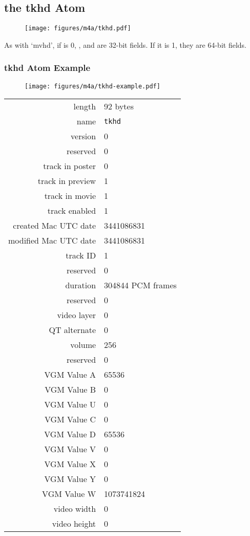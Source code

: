 \subsection{the tkhd Atom}
\label{atom:tkhd}
\begin{figure}[h]
\texttt{[image: figures/m4a/tkhd.pdf]}
\end{figure}
\par
\noindent
As with `mvhd', if  is 0, ,
 and  are 32-bit fields.
If it is 1, they are 64-bit fields.

\clearpage

\subsubsection{tkhd Atom Example}
\begin{figure}[h]
  \texttt{[image: figures/m4a/tkhd-example.pdf]}
\end{figure}
\par
\noindent
\begin{tabular}{rl}
  \textsf{length} & 92 bytes \\
  \textsf{name} & \texttt{tkhd} \\
  \textsf{version} & 0 \\
  \textsf{reserved} & 0 \\
  \textsf{track in poster} & 0 \\
  \textsf{track in preview} & 1 \\
  \textsf{track in movie} & 1 \\
  \textsf{track enabled} & 1 \\
  \textsf{created Mac UTC date} & 3441086831 \\
  \textsf{modified Mac UTC date} & 3441086831 \\
  \textsf{track ID} & 1 \\
  \textsf{reserved} & 0 \\
  \textsf{duration} & 304844 PCM frames \\
  \textsf{reserved} & 0 \\
  \textsf{video layer} & 0 \\
  \textsf{QT alternate} & 0 \\
  \textsf{volume} & 256 \\
  \textsf{reserved} & 0 \\
  \textsf{VGM Value A} & 65536 \\
  \textsf{VGM Value B} & 0 \\
  \textsf{VGM Value U} & 0 \\
  \textsf{VGM Value C} & 0 \\
  \textsf{VGM Value D} & 65536 \\
  \textsf{VGM Value V} & 0 \\
  \textsf{VGM Value X} & 0 \\
  \textsf{VGM Value Y} & 0 \\
  \textsf{VGM Value W} & 1073741824 \\
  \textsf{video width} & 0 \\
  \textsf{video height} & 0 \\
\end{tabular}

